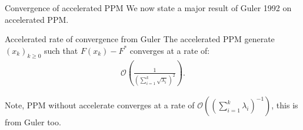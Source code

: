 \documentclass[11pt]{beamer}
\begin{document}
        \begin{frame}{Convergence of accelerated PPM} 
            We now state a major result of Guler 1992 \cite{guler_new_1992} on accelerated PPM. 
            \begin{block}{Accelerated rate of convergence from Guler}
                The accelerated PPM generate $(x_k)_{k\ge 0}$ such that $F(x_k) - F^*$ converges at a rate of: 
                {\large
                \begin{align*}
                    \mathcal O\left(
                        \frac{1}{\left(
                            \sum_{i = 1}^{k}\sqrt{\lambda_i}
                        \right)^2}
                    \right). 
                \end{align*}    
                }
            \end{block}
            Note, PPM without accelerate converges at a rate of $\mathcal O((\sum_{i = 1}^{k}\lambda_i)^{-1})$, this is from Guler too. 
        \end{frame}
\end{document}
